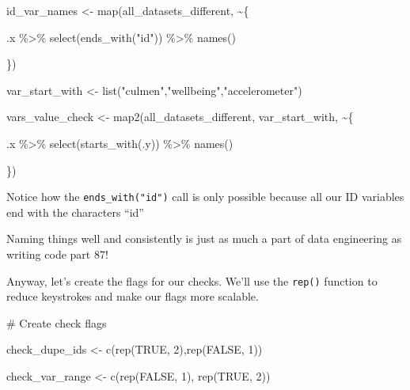 \documentclass[
  letterpaper,
  DIV=11,
  numbers=noendperiod]{scrreprt}
\newenvironment{Shaded}{\begin{snugshade}}{\end{snugshade}}
\newcommand{\CommentTok}[1]{\textcolor[rgb]{0.37,0.37,0.37}{#1}}
\newcommand{\ConstantTok}[1]{\textcolor[rgb]{0.56,0.35,0.01}{#1}}
\newcommand{\DecValTok}[1]{\textcolor[rgb]{0.68,0.00,0.00}{#1}}
\newcommand{\FunctionTok}[1]{\textcolor[rgb]{0.28,0.35,0.67}{#1}}
\newcommand{\NormalTok}[1]{\textcolor[rgb]{0.00,0.23,0.31}{#1}}
\newcommand{\OtherTok}[1]{\textcolor[rgb]{0.00,0.23,0.31}{#1}}
\newcommand{\SpecialCharTok}[1]{\textcolor[rgb]{0.37,0.37,0.37}{#1}}
\newcommand{\StringTok}[1]{\textcolor[rgb]{0.13,0.47,0.30}{#1}}
\begin{document}
\begin{Shaded}
\begin{Highlighting}[]
\NormalTok{id\_var\_names }\OtherTok{\textless{}{-}} \FunctionTok{map}\NormalTok{(all\_datasets\_different, }\SpecialCharTok{\textasciitilde{}}\NormalTok{\{}
  
\NormalTok{  .x }\SpecialCharTok{\%\textgreater{}\%} 
    \FunctionTok{select}\NormalTok{(}\FunctionTok{ends\_with}\NormalTok{(}\StringTok{"id"}\NormalTok{)) }\SpecialCharTok{\%\textgreater{}\%} 
    \FunctionTok{names}\NormalTok{()}
  
\NormalTok{\})}

\NormalTok{var\_start\_with }\OtherTok{\textless{}{-}} \FunctionTok{list}\NormalTok{(}\StringTok{"culmen"}\NormalTok{,}\StringTok{"wellbeing"}\NormalTok{,}\StringTok{"accelerometer"}\NormalTok{)}

\NormalTok{vars\_value\_check }\OtherTok{\textless{}{-}} \FunctionTok{map2}\NormalTok{(all\_datasets\_different, var\_start\_with, }\SpecialCharTok{\textasciitilde{}}\NormalTok{\{}
  
\NormalTok{  .x }\SpecialCharTok{\%\textgreater{}\%} 
    \FunctionTok{select}\NormalTok{(}\FunctionTok{starts\_with}\NormalTok{(.y)) }\SpecialCharTok{\%\textgreater{}\%} 
    \FunctionTok{names}\NormalTok{()}
  
\NormalTok{\})}
\end{Highlighting}
\end{Shaded}

Notice how the \texttt{ends\_with("id")} call is only possible because
all our ID variables end with the characters ``id''

Naming things well and consistently is just as much a part of data
engineering as writing code part 87!

Anyway, let's create the flags for our checks. We'll use the
\texttt{rep()} function to reduce keystrokes and make our flags more
scalable.

\begin{Shaded}
\begin{Highlighting}[]
\CommentTok{\# Create check flags}

\NormalTok{check\_dupe\_ids }\OtherTok{\textless{}{-}} \FunctionTok{c}\NormalTok{(}\FunctionTok{rep}\NormalTok{(}\ConstantTok{TRUE}\NormalTok{, }\DecValTok{2}\NormalTok{),}\FunctionTok{rep}\NormalTok{(}\ConstantTok{FALSE}\NormalTok{, }\DecValTok{1}\NormalTok{))}

\NormalTok{check\_var\_range }\OtherTok{\textless{}{-}} \FunctionTok{c}\NormalTok{(}\FunctionTok{rep}\NormalTok{(}\ConstantTok{FALSE}\NormalTok{, }\DecValTok{1}\NormalTok{), }\FunctionTok{rep}\NormalTok{(}\ConstantTok{TRUE}\NormalTok{, }\DecValTok{2}\NormalTok{))}
\end{Highlighting}
\end{Shaded}
\end{document}

